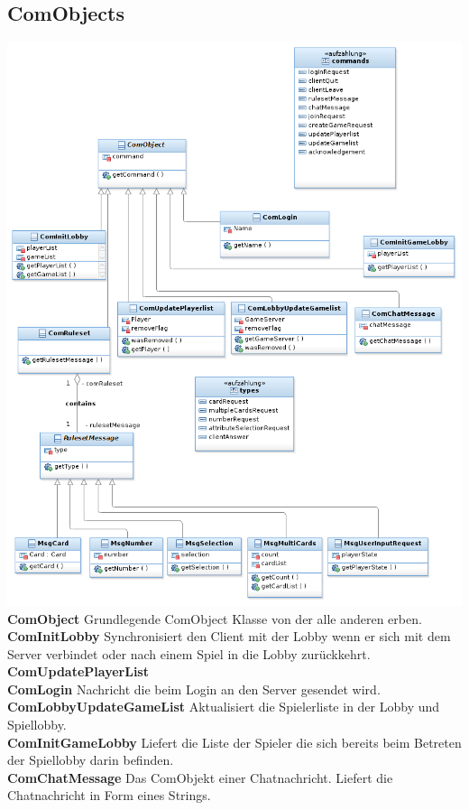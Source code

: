 \documentclass{article}
\begin{document}
\subsection{ComObjects}
\includegraphics[width=\textwidth]{ComDiagram}
\textbf{ComObject} Grundlegende ComObject Klasse von der alle anderen erben.\\
		\textbf{ComInitLobby} Synchronisiert den Client mit der Lobby wenn er sich mit dem Server verbindet oder nach einem Spiel in die Lobby zurückkehrt. \\
		\textbf{ComUpdatePlayerList} \\
		\textbf{ComLogin} Nachricht die beim Login an den Server gesendet wird.\\
		\textbf{ComLobbyUpdateGameList} Aktualisiert die Spielerliste in der Lobby und Spiellobby.\\
		\textbf{ComInitGameLobby} Liefert die Liste der Spieler die sich bereits beim Betreten der Spiellobby darin befinden. \\
		\textbf{ComChatMessage} Das ComObjekt einer Chatnachricht. Liefert die Chatnachricht in Form eines Strings.\\
\end{document}
